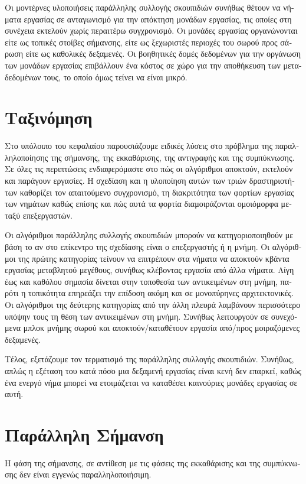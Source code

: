 \begin{greek}
Οι μοντέρνες υλοποιήσεις παράλληλης συλλογής σκουπιδιών συνήθως
θέτουν να νήματα εργασίας σε ανταγωνισμό για την απόκτηση
μονάδων εργασίας, τις οποίες στη συνέχεια εκτελούν χωρίς περαιτέρω
συγχρονισμό. Οι μονάδες εργασίας οργανώνονται είτε ως τοπικές
στοίβες σήμανσης, είτε ως ξεχωριστές περιοχές του σωρού προς
σάρωση είτε ως καθολικές δεξαμενές. Οι βοηθητικές δομές δεδομένων
για την οργάνωση των μονάδων εργασίας επιβάλλουν ένα κόστος σε
χώρο για την αποθήκευση των μεταδεδομένων τους, το οποίο όμως
τείνει να είναι μικρό.

\section{Ταξινόμηση}
Στο υπόλοιπο του κεφαλαίου παρουσιάζουμε ειδικές λύσεις στο
πρόβλημα της παραλληλοποίησης της σήμανσης, της εκκαθάρισης,
της αντιγραφής και της συμπύκνωσης. Σε όλες τις περιπτώσεις
ενδιαφερόμαστε στο πώς οι αλγόριθμοι αποκτούν, εκτελούν και
παράγουν εργασίες. Η σχεδίαση και η υλοποίηση αυτών των τριών
δραστηριοτήτων καθορίζει τον απαιτούμενο συγχρονισμό, τη
διακριτότητα των φορτίων εργασίας των νημάτων καθώς επίσης
και πώς αυτά τα φορτία διαμοιράζονται ομοιόμορφα μεταξύ
επεξεργαστών.

Οι αλγόριθμοι παράλληλης συλλογής σκουπιδιών μπορούν να
κατηγοριοποιηθούν με βάση το αν στο επίκεντρο της σχεδίασης
είναι ο επεξεργαστής ή η μνήμη. Οι αλγόριθμοι της πρώτης
κατηγορίας τείνουν να επιτρέπουν στα νήματα να αποκτούν κβάντα
εργασίας μεταβλητού μεγέθους, συνήθως κλέβοντας εργασία
από άλλα νήματα. Λίγη έως και καθόλου σημασία δίνεται στην
τοποθεσία των αντικειμένων στη μνήμη, παρότι η τοπικότητα
επηρεάζει την επίδοση ακόμη και σε μονοπύρηνες αρχιτεκτονικές.
Οι αλγόριθμοι της δεύτερης κατηγορίας από την άλλη πλευρά
λαμβάνουν περισσότερο υπόψην τους τη θέση των αντικειμένων
στη μνήμη. Συνήθως λειτουργούν σε συνεχόμενα μπλοκ μνήμης
σωρού και αποκτούν/καταθέτουν εργασία από/προς μοιραζόμενες
δεξαμενές.

Τέλος, εξετάζουμε τον τερματισμό της παράλληλης συλλογής
σκουπιδιών. Συνήθως, απλώς η εξέταση του κατά πόσο μια δεξαμενή
εργασίας είναι κενή δεν επαρκεί, καθώς ένα ενεργό νήμα μπορεί
να ετοιμάζεται να καταθέσει καινούριες μονάδες εργασίας σε αυτή.

\section{Παράλληλη Σήμανση}
Η φάση της σήμανσης, σε αντίθεση με τις φάσεις της εκκαθάρισης
και της συμπύκνωσης δεν είναι εγγενώς παραλληλοποιήσιμη.


\end{greek}
